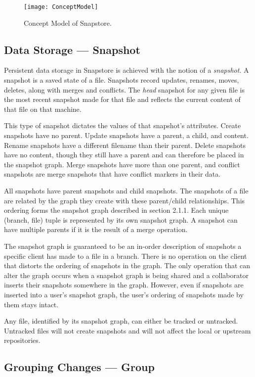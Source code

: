\begin{figure}
\texttt{[image: ConceptModel]}
\caption{Concept Model of Snapstore.}
\label{arm:fig1}
\end{figure}

\subsection{Data Storage --- Snapshot}

Persistent data storage in Snapstore is achieved with the notion of a \textit{snapshot}. A snapshot is a saved state of a file. Snapshots record updates, renames, moves, deletes, along with merges and conflicts. The \textit{head} snapshot for any given file is the most recent snapshot made for that file and reflects the current content of that file on that machine. 

This type of snapshot dictates the values of that snapshot's attributes. Create snapshots have no parent. Update snapshots have a parent, a child, and content. Rename snapshots have a different filename than their parent. Delete snapshots have no content, though they still have a parent and can therefore be placed in the snapshot graph. Merge snapshots have more than one parent, and conflict snapshots are merge snapshots that have conflict markers in their data.

All snapshots have parent snapshots and child snapshots. The snapshots of a file are related by the graph they create with these parent/child relationships. This ordering forms the snapshot graph described in section 2.1.1. Each unique (branch, file) tuple is represented by its own snapshot graph. A snapshot can have multiple parents if it is the result of a merge operation. 

The snapshot graph is guaranteed to be an in-order description of snapshots a specific client has made to a file in a branch. There is no operation on the client that distorts the ordering of snapshots in the graph. The only operation that can alter the graph occurs when a snapshot graph is being shared and a collaborator inserts their snapshots somewhere in the graph. However, even if snapshots are inserted into a user's snapshot graph, the user's ordering of snapshots made by them stays intact.

Any file, identified by its snapshot graph, can either be tracked or untracked. Untracked files will not create snapshots and will not affect the local or upstream repositories.

\subsection{Grouping Changes --- Group}

